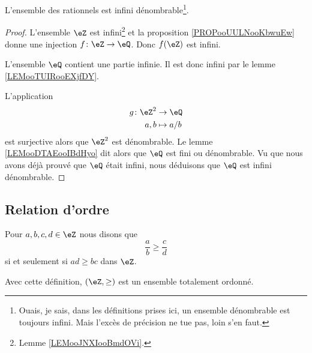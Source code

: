\begin{proposition}     \label{PROPooDHIAooZysvNs}
    L'ensemble des rationnels est infini dénombrable\footnote{Ouais, je sais, dans les définitions prises ici, un ensemble dénombrable est toujours infini. Mais l'excès de précision ne tue pas, loin s'en faut.}.
\end{proposition}

\begin{proof}
    L'ensemble \( \eZ\) est infini\footnote{Lemme \ref{LEMooJNXIooBmdOVi}.} et la proposition \ref{PROPooUULNooKbwuEw} donne une injection \( f\colon \eZ\to \eQ\). Donc \( f(\eZ)\) est infini.

    L'ensemble \( \eQ\) contient une partie infinie. Il est donc infini par le lemme \ref{LEMooTUIRooEXjfDY}.

    L'application
    \begin{equation}
        \begin{aligned}
            g\colon \eZ^2&\to \eQ \\
            a,b&\mapsto a/b 
        \end{aligned}
    \end{equation}
    est surjective alors que \( \eZ^2\) est dénombrable. Le lemme \ref{LEMooDTAEooIBdHyo} dit alors que \( \eQ\) est fini ou dénombrable. Vu que nous avons déjà prouvé que \( \eQ\) était infini, nous déduisons que \( \eQ\) est infini dénombrable.
\end{proof}


\subsection{Relation d'ordre}

\begin{propositionDef}      \label{DEFooZEXXooUtOhqB}
    Pour \( a,b,c,d\in \eZ\) nous disons que
    \begin{equation}
        \frac{ a }{ b }\geq \frac{ c }{ d }
    \end{equation}
    si et seulement si \( ad\geq bc\) dans \( \eZ\).

    Avec cette définition, \( (\eZ,\geq)\) est un ensemble totalement ordonné.
\end{propositionDef}


